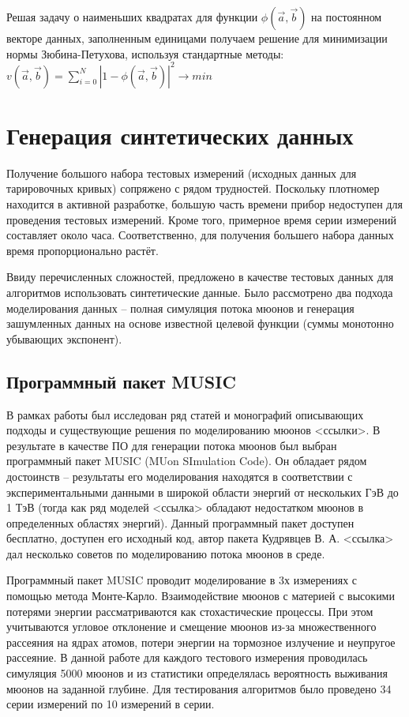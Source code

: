 Решая задачу о наименьших квадратах для функции 
$\phi(\vec{a}, \vec{b})$ на постоянном векторе данных, заполненным
единицами получаем решение для минимизации нормы 
Зюбина-Петухова, используя стандартные методы: 
$v(\vec{a}, \vec{b}) = \displaystyle\sum_{i=0}^N \left|1 -
\phi(\vec{a}, \vec{b})\right|^2 \rightarrow min$


\section{Генерация синтетических данных}\label{sect2_3}


Получение большого набора тестовых измерений (исходных данных 
для тарировочных кривых) сопряжено с рядом трудностей. Поскольку 
плотномер находится в активной разработке,
большую часть времени прибор недоступен для проведения тестовых
измерений. Кроме того, примерное время серии измерений составляет
около часа. Соответственно, 
для получения большего набора данных время пропорционально растёт.


Ввиду перечисленных сложностей, предложено в качестве тестовых
данных для алгоритмов использовать синтетические данные. Было 
рассмотрено два подхода моделирования данных -- 
полная симуляция потока мюонов и генерация зашумленных данных 
на основе известной целевой функции (суммы монотонно убывающих экспонент).


\subsection{Программный пакет MUSIC}\label{subsect2_3_1}


В рамках работы был исследован ряд статей и монографий описывающих подходы и существующие
решения по моделированию мюонов <ссылки>. В результате в качестве ПО для 
генерации потока мюонов
был выбран программный пакет MUSIC (MUon SImulation Code). Он обладает
рядом достоинств -- 
результаты его моделирования находятся в соответствии с экспериментальными
данными в широкой области энергий от нескольких ГэВ до 1 ТэВ (тогда как ряд
моделей <ссылка> обладают
недостатком мюонов в определенных областях энергий). Данный программный 
пакет доступен бесплатно, доступен его исходный код, автор пакета
Кудрявцев В. А. <ссылка> дал несколько 
советов по моделированию потока мюонов в среде.


Программный пакет MUSIC проводит моделирование в 3х измерениях с помощью 
метода Монте-Карло. Взаимодействие мюонов с материей с высокими
потерями энергии рассматриваются 
как стохастические процессы. При этом учитываются угловое отклонение 
и смещение мюонов из-за множественного рассеяния на ядрах атомов, 
потери энергии на тормозное излучение
и неупругое рассеяние. В данной работе для каждого тестового измерения 
проводилась симуляция 5000 мюонов и из статистики определялась вероятность
выживания мюонов на заданной глубине. 
Для тестирования алгоритмов было проведено 34 серии измерений по 10 измерений в серии. 


